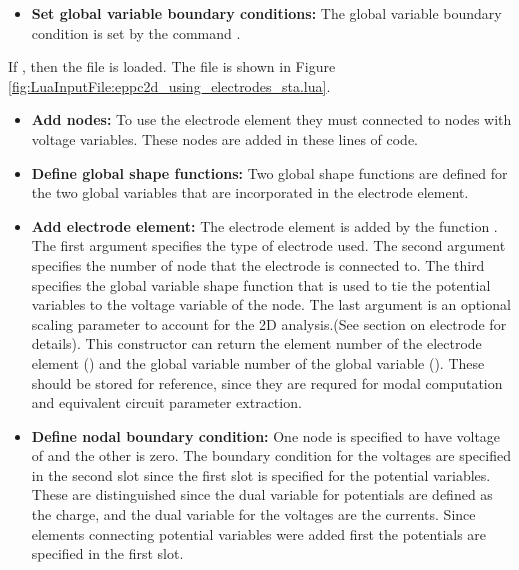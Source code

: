 \begin{itemize}
\begin{itemize}
     \item{\textbf{Set global variable boundary conditions:}}
     The global variable boundary condition is set by the command
     .

  \end{itemize}

  If , then
  the file  is loaded.
  The file is shown in Figure 
  \ref{fig:LuaInputFile:eppc2d_using_electrodes_sta.lua}.
  \begin{itemize}

     \item{\textbf{Add nodes:}}
     To use the electrode element they must connected to nodes 
     with voltage variables. These nodes are added in these lines
     of code.

     \item{\textbf{Define global shape functions:}}
     Two global shape functions are defined for the two global
     variables that are incorporated in the electrode element.

     \item{\textbf{Add electrode element:}}
     The electrode element is added by the function
     . The first argument specifies the 
     type of electrode used. The second argument specifies the 
     number of node that the electrode is connected to. The
     third specifies the global variable shape function that
     is used to tie the potential variables to the voltage variable
     of the node. The last argument is an optional scaling parameter
     to account for the 2D analysis.(See section on electrode for
     details). This constructor can return the element number of 
     the electrode element () and the global 
     variable number of the global variable (). 
     These should be stored for reference, since they are requred
     for modal computation and equivalent circuit parameter 
     extraction. 

     \item{\textbf{Define nodal boundary condition:}}
     One node is specified to have voltage of 
     and the other is zero. The boundary condition for the 
     voltages are specified in the second slot since the 
     first slot is specified for the potential variables. These
     are distinguished since the dual variable for potentials 
     are defined as the charge, and the dual variable for the
     voltages are the currents. Since elements connecting 
     potential variables were added first the potentials are
     specified in the first slot.   


\end{itemize}
\end{itemize}
